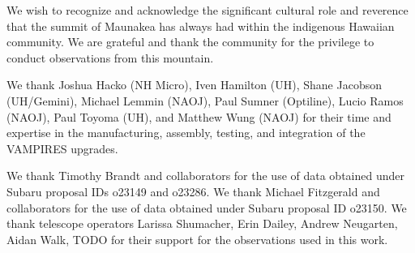 \begin{acknowledgements}
We wish to recognize and acknowledge the significant cultural role and reverence that the summit of Maunakea has always had within the indigenous Hawaiian community. We are grateful and thank the community for the privilege to conduct observations from this mountain.

We thank Joshua Hacko (NH Micro), Iven Hamilton (UH), Shane Jacobson (UH/Gemini), Michael Lemmin (NAOJ), Paul Sumner (Optiline), Lucio Ramos (NAOJ), Paul Toyoma (UH), and Matthew Wung (NAOJ) for their time and expertise in the manufacturing, assembly, testing, and integration of the VAMPIRES upgrades.

We thank Timothy Brandt and collaborators for the use of data obtained under Subaru proposal IDs o23149 and o23286. We thank Michael Fitzgerald and collaborators for the use of data obtained under Subaru proposal ID o23150. We thank telescope operators Larissa Shumacher, Erin Dailey, Andrew Neugarten, Aidan Walk, TODO for their support for the observations used in this work.
\end{acknowledgements}